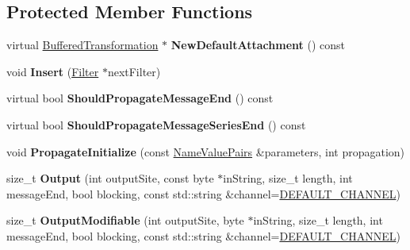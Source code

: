 \subsection*{Protected Member Functions}
\begin{DoxyCompactItemize}
\item 
\hypertarget{class_filter_acb73a3c33a3b589bd85b972729c1604c}{
virtual \hyperlink{class_buffered_transformation}{BufferedTransformation} $\ast$ {\bfseries NewDefaultAttachment} () const }
\label{class_filter_acb73a3c33a3b589bd85b972729c1604c}

\item 
\hypertarget{class_filter_a3aff43294dee9f9b853c7ff96e694a2f}{
void {\bfseries Insert} (\hyperlink{class_filter}{Filter} $\ast$nextFilter)}
\label{class_filter_a3aff43294dee9f9b853c7ff96e694a2f}

\item 
\hypertarget{class_filter_a64df4f582f762b1df2840dbaad89a9e0}{
virtual bool {\bfseries ShouldPropagateMessageEnd} () const }
\label{class_filter_a64df4f582f762b1df2840dbaad89a9e0}

\item 
\hypertarget{class_filter_a3d0af81768490661297d21d7ce202e8d}{
virtual bool {\bfseries ShouldPropagateMessageSeriesEnd} () const }
\label{class_filter_a3d0af81768490661297d21d7ce202e8d}

\item 
\hypertarget{class_filter_a3a24170e0e22a725ea7f0f706d9637a1}{
void {\bfseries PropagateInitialize} (const \hyperlink{class_name_value_pairs}{NameValuePairs} \&parameters, int propagation)}
\label{class_filter_a3a24170e0e22a725ea7f0f706d9637a1}

\item 
\hypertarget{class_filter_aa8fed9b80edd46078be24b92b91baf38}{
size\_\-t {\bfseries Output} (int outputSite, const byte $\ast$inString, size\_\-t length, int messageEnd, bool blocking, const std::string \&channel=\hyperlink{cryptlib_8h_a6f1917f54ea8c2a45de6e08c5087c8de}{DEFAULT\_\-CHANNEL})}
\label{class_filter_aa8fed9b80edd46078be24b92b91baf38}

\item 
\hypertarget{class_filter_ae0b9da65954a553090b52de282ba2130}{
size\_\-t {\bfseries OutputModifiable} (int outputSite, byte $\ast$inString, size\_\-t length, int messageEnd, bool blocking, const std::string \&channel=\hyperlink{cryptlib_8h_a6f1917f54ea8c2a45de6e08c5087c8de}{DEFAULT\_\-CHANNEL})}
\label{class_filter_ae0b9da65954a553090b52de282ba2130}


\end{DoxyCompactItemize}
